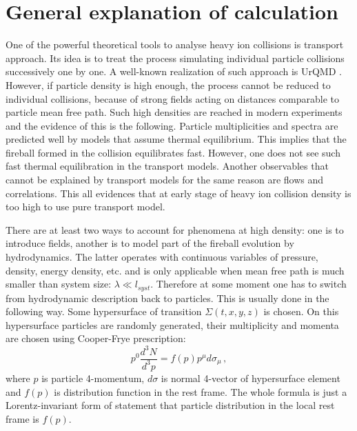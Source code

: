 \documentclass[12pt,a4paper]{report}
\begin{document}
\newpage
\tableofcontents
\newpage

\section{General explanation of calculation}

One of the powerful theoretical tools to analyse heavy ion collisions is transport approach. Its idea is to treat the process simulating individual particle collisions successively one by one. A well-known realization of such approach is UrQMD \cite{ref:UrQMD}. However, if particle density is high enough, the process cannot be reduced to individual collisions, because of strong fields acting on distances comparable to particle mean free path. Such high densities are reached in modern experiments and the evidence of this is the following. Particle multiplicities and spectra are predicted well by models that  assume thermal equilibrium. This implies that the fireball formed in the collision equilibrates fast. However, one does not see such fast thermal equilibration in the transport models. Another observables that cannot be explained by transport models for the same reason are flows and correlations. This all evidences that at early stage of heavy ion collision density is too high to use pure transport model.

There are at least two ways to account for phenomena at high density: one is to introduce fields, another is to model part of the fireball evolution by hydrodynamics. The latter operates with continuous variables of pressure, density, energy density, etc. and is only applicable when mean free path is much smaller than system size: $\lambda \ll l_{syst}$. Therefore at some moment one has to switch from hydrodynamic description back to particles. This is usually done in the following way. Some hypersurface of transition  $\Sigma(t,x,y,z)$ is chosen. On this hypersurface particles are randomly generated, their multiplicity and momenta are chosen using Cooper-Frye prescription:
\begin{equation}
p^{0} \frac{d^3 N}{d^3 p} = f(p) p^{\mu} d\sigma_{\mu} \,,
\end{equation}
where $p$ is particle 4-momentum, $d\sigma$ is normal 4-vector of hypersurface element and $f(p)$ is distribution function in the rest frame. The whole formula is just a Lorentz-invariant form of statement that particle distribution in the local rest frame is $f(p)$. 
\end{document}
